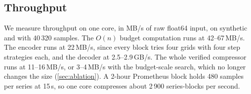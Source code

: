 \subsection{Throughput}
\label{sec:throughput}

We measure throughput on one core, in MB/s of raw float64 input, on
synthetic  and  with 40\,320 samples. The $O(n)$
budget computation runs at 42--67\,MB/s. The encoder runs at 22\,MB/s,
since every block tries four grids with four step strategies each, and
the decoder at 2.5--2.9\,GB/s. The whole verified compressor runs at
11--16\,MB/s, or 3--4\,MB/s with the budget-scale search, which no longer
changes the size (\cref{sec:ablation}). A 2-hour Prometheus block holds
480 samples per series at 15\,s, so one core compresses about 2\,900
series-blocks per second.
